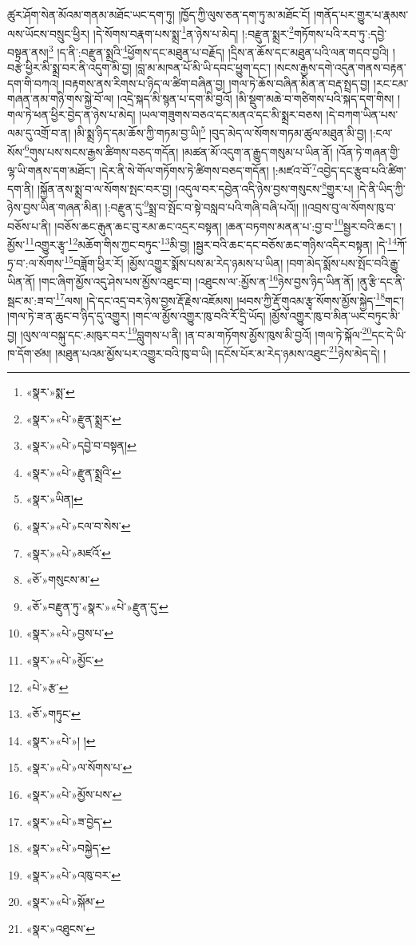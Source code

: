ཚུར་ཤོག་སེན་མོའམ་གནམ་མཐོང་ཡང་དག་ཏུ། །ཁྱོད་ཀྱི་ལུས་ཅན་དག་ཏུ་མ་མཐོང་ངོ། །གནོད་པར་གྱུར་པ་རྣམས་ལས་ཡོངས་བསྲུང་ཕྱིར། །དེ་སོགས་བརྣག་པས་སྨྲ་\footnote{«སྣར་»སྨ་}ན་ཉེས་པ་མེད། །:བརྫུན་སྨྲར་\footnote{«སྣར་»«པེ་»རྫུན་སྨྲར་}གཏོགས་པའི་རབ་ཏུ་:དབྱེ་བསྟན་ནས།\footnote{«སྣར་»«པེ་»དབྱེ་བ་བསྟན།} །ད་ནི་:བརྫུན་སྨྲའི་\footnote{«སྣར་»«པེ་»རྫུན་སྨྲའི་}ཕྱོགས་དང་མཐུན་པ་བརྗོད། །དྲིས་ན་ཆོས་དང་མཐུན་པའི་ལན་གདབ་བྱའི། །བརྩེ་ཕྱིར་མི་སྨྲ་བར་ནི་འདུག་མི་བྱ། །བླ་མ་མཁན་པོ་མི་ཡི་དབང་ཕྱུག་དང་། །སངས་རྒྱས་དགེ་འདུན་གནས་བརྟན་དག་གི་བཀའ། །བརྟགས་ནས་རིགས་པ་ཉིད་ལ་ཚིག་བཞིན་བྱ། །གལ་ཏེ་ཆོས་བཞིན་མིན་ན་བརྡ་སྤྲད་བྱ། །རང་ངམ་གཞན་ནམ་གཉི་གས་སྐྱེ་བོ་ལ། །འདྲེ་སྐད་མི་སྙན་པ་དག་མི་བྱའོ། །མི་སྡུག་མཆེ་བ་གཙིགས་པའི་སྐད་དག་གིས། །གལ་ཏེ་ཕན་ཕྱིར་བྱེད་ན་ཉེས་པ་མེད། །ཡལ་གཟུགས་བཅའ་དང་མནའ་དང་མི་སྨྲར་བཅས། །དེ་བཀག་ཡིན་པས་ལམ་དུ་འགྲོ་བ་ན། །མི་སྨྲ་ཉིད་དམ་ཆོས་ཀྱི་གཏམ་བྱ་ཡི།\footnote{«སྣར་»ཡིན།} །བུད་མེད་ལ་སོགས་གཏམ་ཚུལ་མཐུན་མི་བྱ། །:ངལ་སོས་\footnote{«སྣར་»«པེ་»ངལ་བ་སེས་}གུས་པས་སངས་རྒྱས་ཚིགས་བཅད་གདོན། །མཚན་མོ་འདུག་ན་རྒྱུད་གསུམ་པ་ཡིན་ནོ། །འོན་ཏེ་གཞན་གྱི་ལྷ་ཡི་གནས་དག་མཐོང་། །དེར་ནི་སེ་གོལ་གཏོགས་ཏེ་ཚིགས་བཅད་གདོན། །:མཛའ་བོ་\footnote{«སྣར་»«པེ་»མཛའོ་}འབྱེད་དང་རྩུབ་པའི་ཚིག་དག་ནི། །སྐྱོན་ནས་སྨྲ་བ་ལ་སོགས་སྤང་བར་བྱ། །འདུལ་བར་དབྱེན་འདི་ཉེས་བྱས་གསུངས་\footnote{«ཅོ་»གསུངས་མ་}གྱུར་པ། །དེ་ནི་ཡིད་ཀྱི་ཉེས་བྱས་ཡིན་གཞན་མིན། །:བརྫུན་དུ་\footnote{«ཅོ་»བརྫུན་ཏུ་«སྣར་»«པེ་»རྫུན་དུ་}སྨྲ་བ་སྤོང་བ་སྟེ་བསླབ་པའི་གཞི་བཞི་པའོ།། །།འབྲས་བུ་ལ་སོགས་ཁུ་བ་བཅོས་པ་ནི། །བཅོས་ཆང་རྒུན་ཆང་བུ་རམ་ཆང་འདྲར་བསྟན། །ཆན་བཏགས་མནན་པ་:བྱ་བ་\footnote{«སྣར་»«པེ་»བྱས་པ་}སྦྱར་བའི་ཆང་། །མྱོས་\footnote{«སྣར་»«པེ་»མྱོང་}འགྱུར་རྩྭ་\footnote{«པེ་»རྩ་}མཆོག་གིས་ཀྱང་བཏུང་\footnote{«ཅོ་»གཏུང་}མི་བྱ། །སྦྱར་བའི་ཆང་དང་བཅོས་ཆང་གཉིས་འདིར་བསྟན། །དེ་\footnote{«སྣར་»«པེ་»། །}ཀོ་ཏྲ་བ་:ལ་སོགས་\footnote{«སྣར་»«པེ་»ལ་སོགས་པ་}བཟློག་ཕྱིར་རོ། །མྱོས་འགྱུར་སྨོས་པས་མ་རེད་ཉམས་པ་ཡིན། །བག་མེད་སྨོས་པས་སྤོང་བའི་རྒྱུ་ཡིན་ནོ། །གང་ཞིག་མྱོས་འདུ་ཤེས་པས་མྱོས་འཐུང་བ། །འཐུངས་ལ་:མྱོས་ན་\footnote{«སྣར་»«པེ་»མྱོས་པས་}ཉེས་བྱས་ཉིད་ཡིན་ནོ། །ནུ་རྩི་དང་ནི་སྦང་མ་:ཟ་བ་\footnote{«སྣར་»«པེ་»ཟ་བྱེད་}ལས། །དེ་དང་འདྲ་བར་ཉེས་བྱས་རྡོ་རྗེས་འཇོམས། །ཕབས་ཀྱི་རྡོ་གུའམ་རྩྭ་སོགས་མྱོས་སྐྱེད་\footnote{«སྣར་»«པེ་»བསྐྱེད་}གང་། །གལ་ཏེ་ཟ་ན་ཆུང་བ་ཉིད་དུ་འགྱུར། །གང་ལ་མྱོས་འགྱུར་ཁུ་བའི་རོ་དྲི་ཡོད། །མྱོས་འགྱུར་ཁུ་བ་མིན་ཡང་བཏུང་མི་བྱ། །ལུས་ལ་བསྐུ་དང་:མཁུར་བར་\footnote{«སྣར་»«པེ་»འཁུ་བར་}བླུགས་པ་ནི། །ན་བ་མ་གཏོགས་མྱོས་ཁུས་མི་བྱའོ། །གལ་ཏེ་སྐོལ་\footnote{«སྣར་»«པེ་»སྐོམ་}དང་དེ་ཡི་ཁ་དོག་ཙམ། །མཐུན་པའམ་མྱོས་པར་འགྱུར་བའི་ཁུ་བ་ཡི། །དངོས་པོར་མ་རེད་ཉམས་འཐུང་\footnote{«སྣར་»འཐུངས་}ཉེས་མེད་དེ། །
